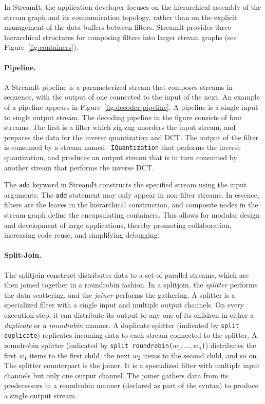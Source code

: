 In StreamIt, the application developer focuses on the hierarchical
assembly of the stream graph and its communication topology, rather
than on the  explicit management of the data buffers between filters.
StreamIt provides three hierarchical structures for composing filters
into larger stream graphs (see Figure~\ref{fig:containers}).

\paragraph{Pipeline.}
A StreamIt pipeline is a parameterized stream that composes streams in
sequence, with the output of one connected to the input of the next.
An example of a pipeline appears in
Figure~\ref{fig:decoder-pipeline}. A pipeline is a single input to
single output stream. The decoding pipeline in the figure consists of
four streams. The first is a filter which zig-zag unorders the input
stream, and prepares the data for the inverse quantization and
DCT. The output of the filter is consumed by a stream named {\tt
IQuantization} that performs the inverse quantization, and produces an
output stream that is in turn consumed by another stream that performs
the inverse DCT.

The {\tt add} keyword in StreamIt constructs the specified stream
using the input arguments. The {\tt add} statement may only appear in
non-filter streams.  In essence, filters are the leaves in the
hierarchical construction, and composite nodes in the stream graph
define the encapsulating containers. This allows for modular design
and development of large applications, thereby  promoting
collaboration, increasing code reuse, and simplifying debugging.

\paragraph{Split-Join.}
The splitjoin construct distributes data to a set of parallel
streams, which are then joined together in a roundrobin fashion. In a
splitjoin, the {\it splitter} performs the data scattering, and the
{\it joiner} performs the gathering. A splitter is a specialized
filter with a single input and multiple output channels. On every
execution step, it can distribute its output to any one of its
children in either a {\it duplicate} or a {\it roundrobin} manner.  A
duplicate splitter (indicated by \texttt{split duplicate}) replicates
incoming data to each stream connected to the splitter.  A
roundrobin splitter (indicated by {\tt split
roundrobin($w_1,\ldots,w_n$)}) distributes the first $w_1$ items to
the first child, the next $w_2$ items to the second child, and so
on.  The splitter counterpart is the joiner. It is a specialized
filter with multiple input channels but only one output channel. The
joiner gathers data from its predecessors in a roundrobin manner
(declared as part of the syntax) to produce a single output stream.

